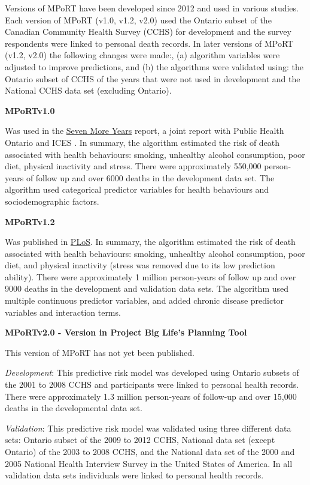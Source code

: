 \documentclass[]{book}
\begin{document}
Versions of MPoRT have been developed since 2012 and used in various
studies. Each version of MPoRT (v1.0, v1.2, v2.0) used the Ontario
subset of the Canadian Community Health Survey (CCHS) for development
and the survey respondents were linked to personal death records. In
later versions of MPoRT (v1.2, v2.0) the following changes were made:,
(a) algorithm variables were adjusted to improve predictions, and (b)
the algorithms were validated using: the Ontario subset of CCHS of the
years that were not used in development and the National CCHS data set
(excluding Ontario).

\textbf{MPoRTv1.0}

Was used in the
\href{https://www.ices.on.ca/Publications/Atlases-and-Reports/2012/Seven-More-Years}{Seven
More Years} report, a joint report with Public Health Ontario and ICES .
In summary, the algorithm estimated the risk of death associated with
health behaviours: smoking, unhealthy alcohol consumption, poor diet,
physical inactivity and stress. There were approximately 550,000
person-years of follow up and over 6000 deaths in the development data
set. The algorithm used categorical predictor variables for health
behaviours and sociodemographic factors.

\textbf{MPoRTv1.2}

Was published in
\href{https://journals.plos.org/plosmedicine/article?id=10.1371/journal.pmed.1002082}{PLoS}.
In summary, the algorithm estimated the risk of death associated with
health behaviours: smoking, unhealthy alcohol consumption, poor diet,
and physical inactivity (stress was removed due to its low prediction
ability). There were approximately 1 million person-years of follow up
and over 9000 deaths in the development and validation data sets. The
algorithm used multiple continuous predictor variables, and added
chronic disease predictor variables and interaction terms.

\textbf{MPoRTv2.0 - Version in Project Big Life's Planning Tool}

This version of MPoRT has not yet been published.

\emph{Development}: This predictive risk model was developed using
Ontario subsets of the 2001 to 2008 CCHS and participants were linked to
personal health records. There were approximately 1.3 million
person-years of follow-up and over 15,000 deaths in the developmental
data set.

\emph{Validation}: This predictive risk model was validated using three
different data sets: Ontario subset of the 2009 to 2012 CCHS, National
data set (except Ontario) of the 2003 to 2008 CCHS, and the National
data set of the 2000 and 2005 National Health Interview Survey in the
United States of America. In all validation data sets individuals were
linked to personal health records.
\end{document}

